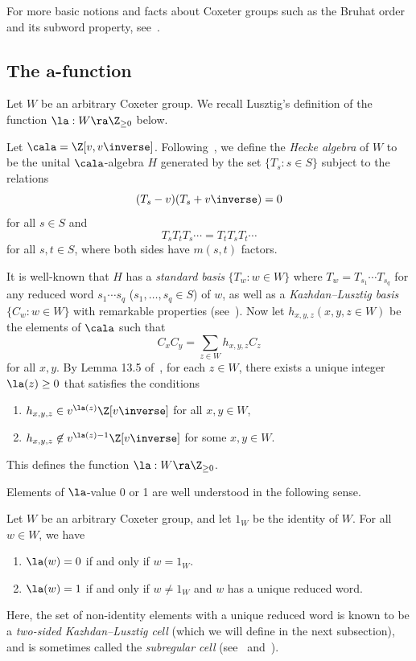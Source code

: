 For more basic notions and facts about Coxeter groups such as 
the Bruhat order and its subword property, see~\cite{BB}.

\subsection{The \texorpdfstring{$\mathbf{a}$}{a}-function}
Let $W$ be an arbitrary Coxeter group. We recall Lusztig's definition of the function
$\la: W\ra \Z_{\ge 0}$ below.

Let $\cala=\Z[v,v\inverse]$. Following~\cite{LG}, we define the \emph{Hecke
algebra} of $W$ to be the unital $\cala$-algebra $H$ generated by the set
$\{T_s:s\in S\}$ subject to the relations 
\begin{equation}
 (T_s-v)(T_s+v\inverse)=0
 \label{eq:our normalization}
\end{equation}
for all $s\in S$ and 
\[
 T_sT_tT_s\cdots = T_tT_sT_t\cdots
\]
for all $s,t\in S$, where both sides have $m(s,t)$ factors.

It is well-known
that $H$ has a \emph{standard basis} $\{T_w:w\in W\}$ where
$T_w=T_{s_1}\cdots T_{s_q}$ for any reduced word $s_1\cdots s_q$ ($s_1,\ldots,
s_q\in S$) of $w$, as well as a \emph{Kazhdan--Lusztig basis} $\{C_w:w\in W\}$
with remarkable properties (see~\cite{EW}). Now let $h_{x,y,z} (x,y,z\in W)$ be the elements of $\cala$
such that
\[
 C_xC_y=\sum_{z\in W} h_{x,y,z}C_z
\]
for all $x,y$. By Lemma 13.5 of~\cite{LG}, for each $z\in W$, there exists a
unique integer $\la(z)\ge 0$ that satisfies the conditions
\begin{enumerate}
 \item $h_{x,y,z}\in v^{\la(z)}\Z[v\inverse]$ for all $x,y\in W$,
 \item $h_{x,y,z}\not\in v^{\la(z)-1}\Z[v\inverse]$ for some $x,y\in W$.
\end{enumerate}
This defines the function $\la: W\ra\Z_{\ge 0}$.


Elements of $\la$-value 0 or 1 are well understood in the following sense. 
\begin{prop}
 \label{subregular}
 Let $W$ be an arbitrary Coxeter group, and let $1_W$ be the identity of
 $W$. For all $w\in W$, we have
 \begin{enumerate}
 \item $\la(w)=0$ if and only if
 $w=1_W$.
 \item $\la(w)=1$ if and only if $w\neq 1_W$ and $w$ has a
 unique reduced word.
 \end{enumerate}
\end{prop}
\noindent Here, the set of non-identity elements with a unique reduced word is
known to be a \emph{two-sided Kazhdan--Lusztig
cell} (which we will define in the next subsection), and is sometimes called the \emph{subregular cell} (see~\cite{subregular}
and~\cite{Xu}). 
%
%
%

